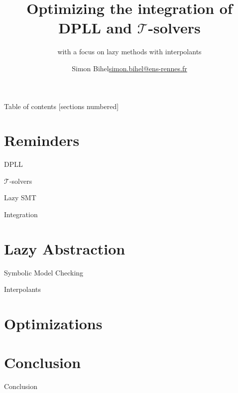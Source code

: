 \documentclass{beamer}
\title{Optimizing the integration of DPLL and $\mathcal{T}$-solvers}
\subtitle{with a focus on lazy methods with interpolants}
\date{\displaydate{defensedate}}
\author{%
  Simon Bihel\hfill\url{simon.bihel@ens-rennes.fr} \\
}
\institute{%
  University of Rennes I \\
  \'Ecole Normale Sup\'erieure de Rennes
}
\begin{document}
\maketitle

\begin{frame}{Table of contents}
  [sections numbered]
  \tableofcontents[hideallsubsections]
\end{frame}


\section{Reminders}

\begin{frame}{DPLL}
\end{frame}

\begin{frame}{$\mathcal{T}$-solvers}
\end{frame}

\begin{frame}{Lazy SMT}
\end{frame}

\begin{frame}{Integration}
\end{frame}


\section{Lazy Abstraction}

\begin{frame}{Symbolic Model Checking}
\end{frame}

\begin{frame}{Interpolants}
\end{frame}

\section{Optimizations}




\section*{Conclusion}

\begin{frame}{Conclusion}
\end{frame}
\end{document}
